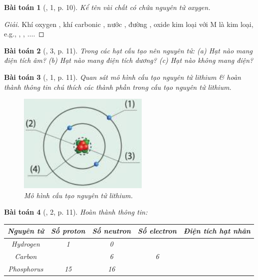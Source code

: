 \documentclass{article}
\newtheorem{baitoan}{Bài toán}
\begin{document}
\begin{baitoan}[\cite{SGK_KHTN_7_Canh_Dieu}, 1, p. 10]
	Kể tên vài chất có chứa nguyên tử oxygen.
\end{baitoan}

\begin{proof}[Giải]
	Khí oxygen , khí carbonic , nước , đường , oxide kim loại  với M là kim loại, e.g., , , $\ldots$.
\end{proof}

\begin{baitoan}[\cite{SGK_KHTN_7_Canh_Dieu}, 3, p. 11]
	Trong các hạt cấu tạo nên nguyên tử: (a) Hạt nào mang điện tích âm? (b) Hạt nào mang điện tích dương? (c) Hạt nào không mang điện?
\end{baitoan}

\begin{baitoan}[\cite{SGK_KHTN_7_Canh_Dieu}, 1, p. 11]
	Quan sát mô hình cấu tạo nguyên tử lithium \& hoàn thành thông tin chú thích các thành phần trong cấu tạo nguyên tử lithium.
	\begin{figure}[H]
		\centering
		\includegraphics[scale=0.4]{lithium}
		\caption{Mô hình cấu tạo nguyên tử lithium.}
	\end{figure}
\end{baitoan}

\begin{baitoan}[\cite{SGK_KHTN_7_Canh_Dieu}, 2, p. 11]
	Hoàn thành thông tin:
	\begin{table}[H]
		\centering
		\begin{tabular}{|c|c|c|c|c|}
			\hline
			Nguyên tử & Số proton & Số neutron & Số electron & Điện tích hạt nhân \\
			\hline
			Hydrogen & 1 & 0 &  &  \\
			\hline
			Carbon &  & 6 & 6 &  \\
			\hline
			Phosphorus & 15 & 16 &  &  \\
			\hline
		\end{tabular}
	\end{table}
\end{baitoan}
\end{document}
